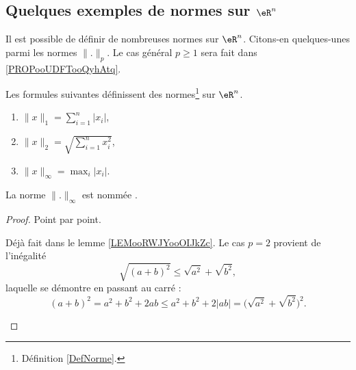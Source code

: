 \subsection{Quelques exemples de normes sur \texorpdfstring{\( \eR^n\)}{Rn}}

Il est possible de définir de nombreuses normes sur \( \eR^n\). Citons-en quelques-unes parmi les normes \( \| . \|_p\). Le cas général \( p\geq 1\) sera fait dans \ref{PROPooUDFTooQyhAtq}.

\begin{propositionDef}      \label{PROPooCLZRooIRxCnZ}
	Les formules suivantes définissent des normes\footnote{Définition \ref{DefNorme}.} sur \( \eR^n\).
	\begin{enumerate}
		\item       \label{ITEMooQBLGooPQKSev}
		      \( \| x \|_1=\sum_{i=1}^n| x_i |\),
		\item       \label{ITEMooXQUFooLHrITI}
		      \( \| x \|_2=\sqrt{ \sum_{i=1}^nx_i^2 }\),
		\item       \label{ITEMooSOVDooTuhEik}
		      \( \| x \|_{\infty}=\max_i| x_i |\).
	\end{enumerate}
	La norme \( \| . \|_{\infty}\) est nommée .
\end{propositionDef}

\begin{proof}
	Point par point.
	\begin{subproof}
		Déjà fait dans le lemme \ref{LEMooRWJYooOIJkZc}.
		Le cas \( p=2\) provient de l'inégalité
		\begin{equation}
			\sqrt{ (a+b)^2 }\leq \sqrt{ a^2 }+\sqrt{ b^2 },
		\end{equation}
		laquelle se démontre en passant au carré :
		\begin{equation}        \label{EQooRYNYooTzZpPz}
			(a+b)^2=a^2+b^2+2ab\leq a^2+b^2+2| ab |=\big( \sqrt{ a^2 }+\sqrt{ b^2 } \big)^2.
		\end{equation}
	\end{subproof}
\end{proof}

